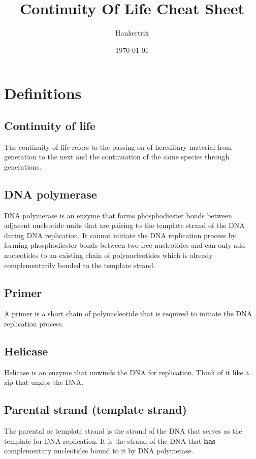 \documentclass[11pt]{article}
\author{Hankertrix}
\date{\today}
\title{Continuity Of Life Cheat Sheet}
\begin{document}
\maketitle
\setcounter{tocdepth}{2}
\tableofcontents

\newpage

\section{Definitions}
\label{sec:orgc5cd5eb}

\subsection{Continuity of life}
\label{sec:org3510942}
The continuity of life refers to the passing on of hereditary material from generation to the next and the continuation of the same species through generations.

\subsection{DNA polymerase}
\label{sec:orgd532a89}
DNA polymerase is an enzyme that forms phosphodiester bonds between adjacent nucleotide units that are pairing to the template strand of the DNA during DNA replication. It cannot initiate the DNA replication process by forming phosphodiester bonds between two free nucleotides and can only add nucleotides to an existing chain of polynucleotides which is already complementarily bonded to the template strand.

\subsection{Primer}
\label{sec:org999f96d}
A primer is a short chain of polynucleotide that is required to initiate the DNA replication process.

\subsection{Helicase}
\label{sec:org495b894}
Helicase is an enzyme that unwinds the DNA for replication. Think of it like a zip that unzips the DNA.

\subsection{Parental strand (template strand)}
\label{sec:org950ee06}
The parental or template strand is the strand of the DNA that serves as the template for DNA replication. It is the strand of the DNA that \textbf{has} complementary nucleotides bound to it by DNA polymerase.
\end{document}
